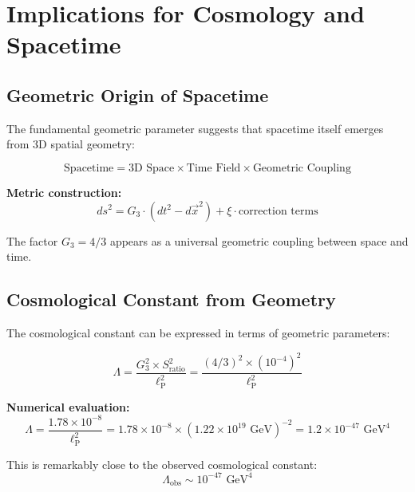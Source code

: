 \documentclass[12pt,a4paper]{report}
\newcommand{\lP}{\ell_{\text{P}}}         %
\begin{document}
	\section{Implications for Cosmology and Spacetime}
	\label{sec:cosmology_spacetime}
	
	\subsection{Geometric Origin of Spacetime}
	\label{subsec:geometric_origin_spacetime}
	
	The fundamental geometric parameter suggests that spacetime itself emerges from 3D spatial geometry:
	
	\begin{equation}
		\text{Spacetime} = \text{3D Space} \times \text{Time Field} \times \text{Geometric Coupling}
	\end{equation}
	
	\textbf{Metric construction:}
	\begin{equation}
		ds^2 = G_3 \cdot \left(dt^2 - d\vec{x}^2\right) + \xi \cdot \text{correction terms}
	\end{equation}
	
	The factor $G_3 = 4/3$ appears as a universal geometric coupling between space and time.
	
	\subsection{Cosmological Constant from Geometry}
	\label{subsec:cosmological_constant}
	
	The cosmological constant can be expressed in terms of geometric parameters:
	
	\begin{equation}
		\Lambda = \frac{G_3^2 \times S_{\text{ratio}}^2}{\lP^2} = \frac{(4/3)^2 \times (10^{-4})^2}{\lP^2}
	\end{equation}
	
	\textbf{Numerical evaluation:}
	\begin{equation}
		\Lambda = \frac{1.78 \times 10^{-8}}{\lP^2} = 1.78 \times 10^{-8} \times (1.22 \times 10^{19} \text{ GeV})^{-2} = 1.2 \times 10^{-47} \text{ GeV}^4
	\end{equation}
	
	This is remarkably close to the observed cosmological constant:
	\begin{equation}
		\Lambda_{\text{obs}} \sim 10^{-47} \text{ GeV}^4
	\end{equation}
	
\end{document}
